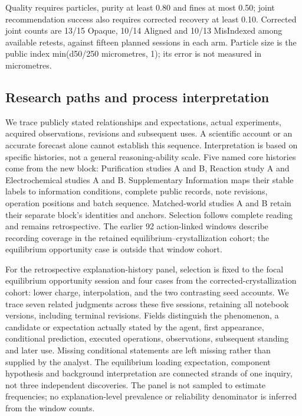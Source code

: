 \documentclass[10pt,a4paper]{article}
\begin{document}
Quality requires particles, purity at least 0.80 and fines at most 0.50; joint recommendation success also requires corrected recovery at least 0.10. Corrected joint counts are 13/15 Opaque, 10/14 Aligned and 10/13 MisIndexed among available retests, against fifteen planned sessions in each arm. Particle size is the public index min(d50/250 micrometres, 1); its error is not measured in micrometres.

\subsection{Research paths and process interpretation}\label{research-paths-and-process-interpretation}

We trace publicly stated relationships and expectations, actual experiments, acquired observations, revisions and subsequent uses. A scientific account or an accurate forecast alone cannot establish this sequence. Interpretation is based on specific histories, not a general reasoning-ability scale. Five named core histories come from the new block: Purification studies A and B, Reaction study A and Electrochemical studies A and B. Supplementary Information maps their stable labels to information conditions, complete public records, note revisions, operation positions and batch sequence. Matched-world studies A and B retain their separate block's identities and anchors. Selection follows complete reading and remains retrospective. The earlier 92 action-linked windows describe recording coverage in the retained equilibrium--crystallization cohort; the equilibrium opportunity case is outside that window cohort.

For the retrospective explanation-history panel, selection is fixed to the focal equilibrium opportunity session and four cases from the corrected-crystallization cohort: lower charge, interpolation, and the two contrasting seed accounts. We trace seven related judgments across these five sessions, retaining all notebook versions, including terminal revisions. Fields distinguish the phenomenon, a candidate or expectation actually stated by the agent, first appearance, conditional prediction, executed operations, observations, subsequent standing and later use. Missing conditional statements are left missing rather than supplied by the analyst. The equilibrium loading expectation, component hypothesis and background interpretation are connected strands of one inquiry, not three independent discoveries. The panel is not sampled to estimate frequencies; no explanation-level prevalence or reliability denominator is inferred from the window counts.
\end{document}
